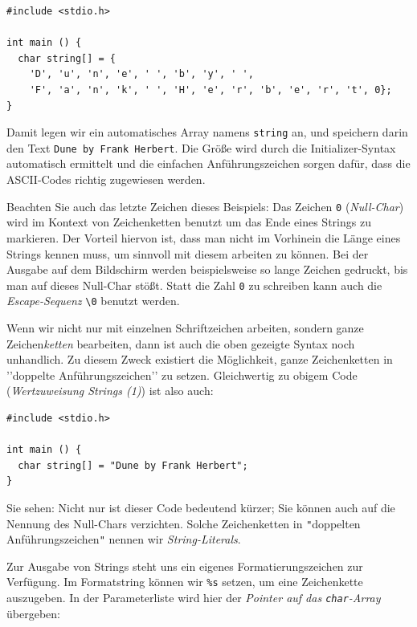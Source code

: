 \begin{codebox}
\begin{verbatim}
#include <stdio.h>

int main () {
  char string[] = {
    'D', 'u', 'n', 'e', ' ', 'b', 'y', ' ',
    'F', 'a', 'n', 'k', ' ', 'H', 'e', 'r', 'b', 'e', 'r', 't', 0};
}
\end{verbatim}
\end{codebox}

Damit legen wir ein automatisches Array namens \texttt{string} an, und speichern darin den Text \texttt{Dune by Frank Herbert}. Die Größe wird durch die Initializer-Syntax automatisch ermittelt und die einfachen Anführungszeichen sorgen dafür, dass die ASCII-Codes richtig zugewiesen werden.

Beachten Sie auch das letzte Zeichen dieses Beispiels: Das Zeichen \texttt{0} (\emph{Null-Char}) wird im Kontext von Zeichenketten benutzt um das Ende eines Strings zu markieren. Der Vorteil hiervon ist, dass man nicht im Vorhinein die Länge eines Strings kennen muss, um sinnvoll mit diesem arbeiten zu können. Bei der Ausgabe auf dem Bildschirm werden beispielsweise so lange Zeichen gedruckt, bis man auf dieses Null-Char stößt. Statt die Zahl \texttt{0} zu schreiben kann auch die \emph{Escape-Sequenz} \texttt{\textbackslash 0} benutzt werden.

Wenn wir nicht nur mit einzelnen Schriftzeichen arbeiten, sondern ganze Zeichen\emph{ketten} bearbeiten,  dann ist auch die oben gezeigte Syntax noch unhandlich. Zu diesem Zweck existiert die Möglichkeit, ganze Zeichenketten in '{}'doppelte Anführungszeichen'{}' zu setzen. Gleichwertig zu obigem Code (\emph{Wertzuweisung Strings (1)}) ist also auch:

\begin{codebox}
\begin{verbatim}
#include <stdio.h>

int main () {
  char string[] = "Dune by Frank Herbert";
}
\end{verbatim}
\end{codebox}

Sie sehen: Nicht nur ist dieser Code bedeutend kürzer; Sie können auch auf die Nennung des Null-Chars verzichten. Solche Zeichenketten in \texttt{"}doppelten Anführungszeichen\texttt{"} nennen wir \emph{String-Literals}.

Zur Ausgabe von Strings steht uns ein eigenes Formatierungszeichen zur Verfügung. Im Formatstring können wir \texttt{\%s} setzen, um eine Zeichenkette auszugeben. In der Parameterliste wird hier der \emph{Pointer auf das \texttt{char}-Array} übergeben:

